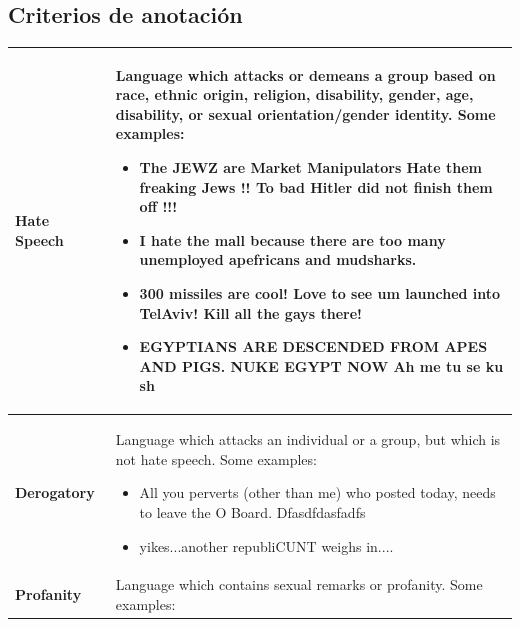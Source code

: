 

\citet{gao2018detecting}

\subsection{Criterios de anotación}

\begin{table}[t]
    \centering
    \begin{tabular}{p{0.20\linewidth}  p{0.80\linewidth}}
        \textbf{Hate Speech} & Language which attacks or demeans a group based on race, ethnic origin, religion, disability, gender, age, disability,
        or sexual orientation/gender identity. Some examples:
        \begin{itemize}
            \item The JEWZ are Market Manipulators Hate them freaking Jews !! To bad Hitler did not finish them off !!!
            \item  I hate the mall because there are too many unemployed apefricans and mudsharks.
            \item 300 missiles are cool! Love to see um launched into TelAviv! Kill all the gays there!
            \item EGYPTIANS ARE DESCENDED FROM APES AND PIGS. NUKE EGYPT NOW Ah me tu se ku sh
        \end{itemize} \\

        \hline

        \textbf{Derogatory} & Language which attacks an individual or a group, but which is not hate speech. Some examples:
        \begin{itemize}
            \item All you perverts (other than me) who posted today, needs to leave the O Board. Dfasdfdasfadfs
            \item yikes...another republiCUNT weighs in....
        \end{itemize} \\

        \hline

        \textbf{Profanity} & Language which contains sexual remarks or profanity. Some examples:


\end{tabular}
\end{table}
